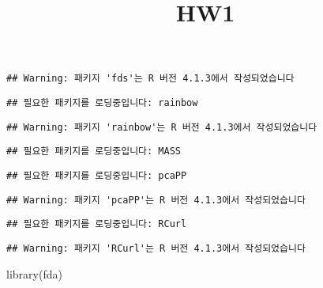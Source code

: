 \documentclass[
]{article}
\title{HW1}
\author{}
\date{\vspace{-2.5em}}
\newenvironment{Shaded}{\begin{snugshade}}{\end{snugshade}}
\newcommand{\AttributeTok}[1]{\textcolor[rgb]{0.77,0.63,0.00}{#1}}
\newcommand{\ConstantTok}[1]{\textcolor[rgb]{0.00,0.00,0.00}{#1}}
\newcommand{\FunctionTok}[1]{\textcolor[rgb]{0.00,0.00,0.00}{#1}}
\newcommand{\NormalTok}[1]{#1}
\newcommand{\SpecialCharTok}[1]{\textcolor[rgb]{0.00,0.00,0.00}{#1}}
\begin{document}
\maketitle

\begin{Shaded}
\end{Shaded}

\begin{verbatim}
## Warning: 패키지 'fds'는 R 버전 4.1.3에서 작성되었습니다
\end{verbatim}

\begin{verbatim}
## 필요한 패키지를 로딩중입니다: rainbow
\end{verbatim}

\begin{verbatim}
## Warning: 패키지 'rainbow'는 R 버전 4.1.3에서 작성되었습니다
\end{verbatim}

\begin{verbatim}
## 필요한 패키지를 로딩중입니다: MASS
\end{verbatim}

\begin{verbatim}
## 필요한 패키지를 로딩중입니다: pcaPP
\end{verbatim}

\begin{verbatim}
## Warning: 패키지 'pcaPP'는 R 버전 4.1.3에서 작성되었습니다
\end{verbatim}

\begin{verbatim}
## 필요한 패키지를 로딩중입니다: RCurl
\end{verbatim}

\begin{verbatim}
## Warning: 패키지 'RCurl'는 R 버전 4.1.3에서 작성되었습니다
\end{verbatim}

\begin{Shaded}
\begin{Highlighting}[]
\FunctionTok{library}\NormalTok{(fda)}
\end{Highlighting}
\end{Shaded}
\end{document}
